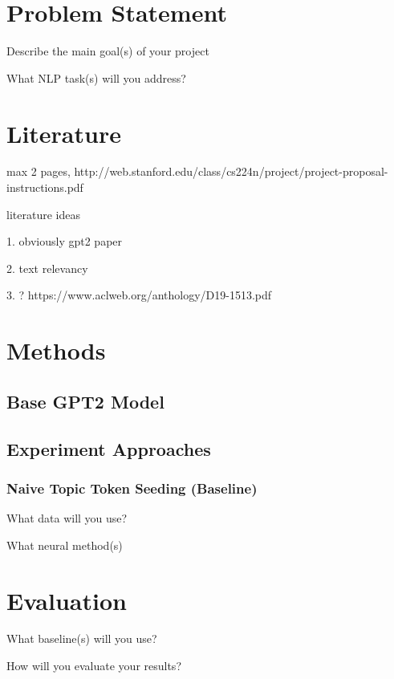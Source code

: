 \documentclass{article}
\begin{document}




\section{Problem Statement}

Describe the main goal(s) of your project

What NLP task(s) will you address? 

\section{Literature}

max 2 pages, http://web.stanford.edu/class/cs224n/project/project-proposal-instructions.pdf

literature ideas

1. obviously gpt2 paper

2. text relevancy 

3. ? https://www.aclweb.org/anthology/D19-1513.pdf

\section{Methods}

\subsection{Base GPT2 Model}

\subsection{Experiment Approaches}

\subsubsection{Naive Topic Token Seeding (Baseline)}



What data will you use?

What neural method(s)

\section{Evaluation}

What baseline(s) will you use?

How will you evaluate your results?

  

\begin{thebibliography}{1}
    
\end{thebibliography}
\end{document}
